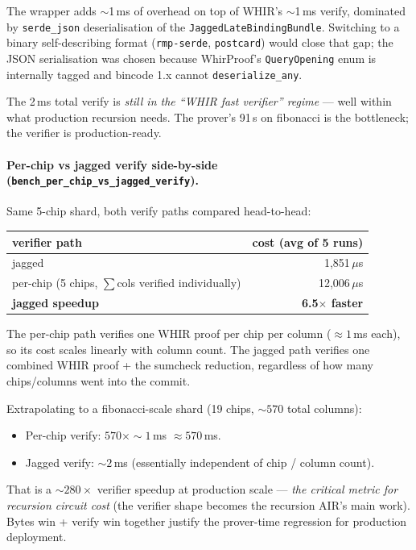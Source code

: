 The wrapper adds $\sim$1\,ms of overhead on top of WHIR's
$\sim$1\,ms verify, dominated by \texttt{serde\_json}
deserialisation of the \texttt{JaggedLateBindingBundle}.  Switching
to a binary self-describing format (\texttt{rmp-serde},
\texttt{postcard}) would close that gap; the JSON serialisation was
chosen because WhirProof's \texttt{QueryOpening} enum is
internally tagged and bincode 1.x cannot \texttt{deserialize\_any}.

The 2\,ms total verify is \emph{still in the ``WHIR fast verifier''
regime} --- well within what production recursion needs.  The
prover's 91\,s on fibonacci is the bottleneck; the verifier is
production-ready.

\paragraph{Per-chip vs jagged verify side-by-side
(\texttt{bench\_per\_chip\_vs\_jagged\_verify}).}
Same 5-chip shard, both verify paths compared head-to-head:

\begin{tabular}{lr}
\toprule
\textbf{verifier path}     & \textbf{cost (avg of 5 runs)} \\
\midrule
jagged                     & 1{,}851\,$\mu$s \\
per-chip (5 chips, $\sum$cols verified individually) & 12{,}006\,$\mu$s \\
\midrule
\textbf{jagged speedup}    & \textbf{6.5$\times$ faster} \\
\bottomrule
\end{tabular}

The per-chip path verifies one WHIR proof per chip per column
($\approx 1$\,ms each), so its cost scales linearly with column count.
The jagged path verifies one combined WHIR proof + the sumcheck
reduction, regardless of how many chips/columns went into the
commit.

Extrapolating to a fibonacci-scale shard (19 chips, $\sim 570$ total
columns):
\begin{itemize}
  \item Per-chip verify: $570 \times \sim 1$\,ms $\approx 570$\,ms.
  \item Jagged verify: $\sim 2$\,ms (essentially independent of
        chip / column count).
\end{itemize}
That is a $\sim 280\times$ verifier speedup at production scale ---
\emph{the critical metric for recursion circuit cost} (the verifier
shape becomes the recursion AIR's main work).  Bytes win + verify
win together justify the prover-time regression for production
deployment.

